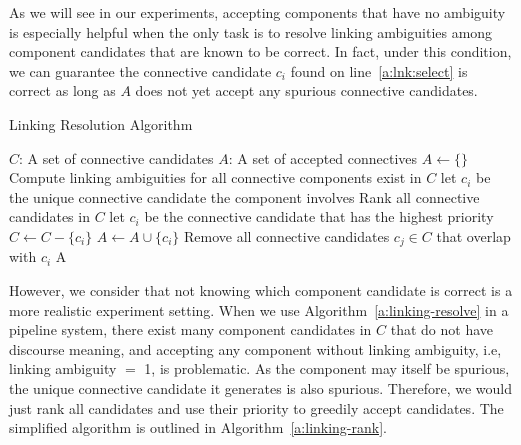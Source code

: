 As we will see in our experiments, accepting components that have no ambiguity
is especially helpful when the only task is to resolve linking ambiguities among
component candidates that are known to be correct.
In fact, under this condition, we can guarantee the connective candidate
$c_i$ found on line~\ref{a:lnk:select} is correct as long as $A$ does not yet accept
any spurious connective candidates.

\begin{algorithm}
    \caption{Linking Resolution Algorithm}
    \label{a:linking-resolve}
    \begin{algorithmic}[1]
        \Require
            $C$: A set of connective candidates
        \Ensure
            $A$: A set of accepted connectives
        \State $A \gets \{\}$
            \State Compute linking ambiguities for all connective components exist in $C$ \label{a:lnk:compute}
             \label{a:lnk:check}
                \State let $ c_i $ be the unique connective candidate the component involves \label{a:lnk:select}
            \Else
                \State Rank all connective candidates in $ C $
                \State let $ c_i $ be the connective candidate that has the highest priority
            \EndIf
                \State $C \gets C - \{c_i\}$
                \State $A \gets A \cup \{c_i\}$
            \State Remove all connective candidates $ c_j \in C $ that overlap with $ c_i $
        \EndWhile
        \State \Return A
    \end{algorithmic}
\end{algorithm}

However, we consider that not knowing
which component candidate is correct is a more realistic experiment setting.
When we use Algorithm~\ref{a:linking-resolve} in a pipeline system,
there exist many component candidates in $C$ that do not have discourse meaning,
and accepting any component without linking ambiguity, i.e, linking ambiguity $=$ 1,
is problematic. As the component may itself be spurious, the unique connective
candidate it generates is also spurious.
Therefore, we would just rank all
candidates and use their priority to greedily accept candidates. The simplified
algorithm is outlined in Algorithm~\ref{a:linking-rank}.

